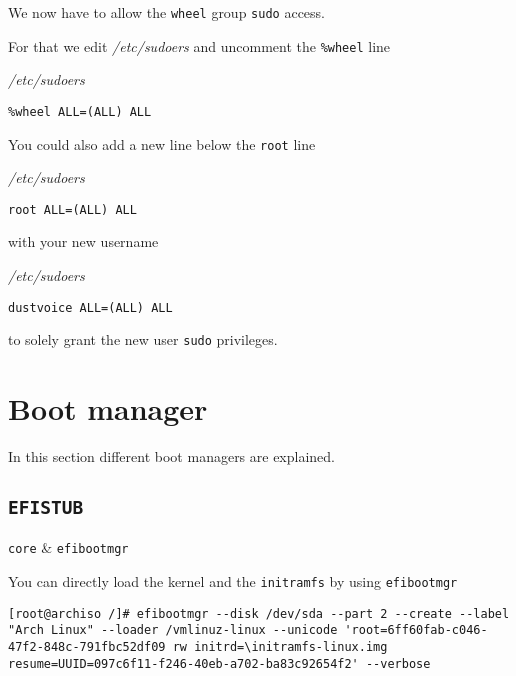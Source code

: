 \documentclass[10pt]{dustdoc}
\begin{document}
We now have to allow the \texttt{wheel} group \texttt{sudo} access.

For that we edit \textit{/etc/sudoers} and uncomment the \texttt{\%wheel} line

\begin{mintedlisting}
    \caption*{\textit{/etc/sudoers}}
    \begin{verbatim}
%wheel ALL=(ALL) ALL
    \end{verbatim}
\end{mintedlisting}

You could also add a new line below the \texttt{root} line

\begin{mintedlisting}
    \caption*{\textit{/etc/sudoers}}
    \begin{verbatim}
root ALL=(ALL) ALL
    \end{verbatim}
\end{mintedlisting}

\noindent
with your new username

\begin{mintedlisting}
    \caption*{\textit{/etc/sudoers}}
    \begin{verbatim}
dustvoice ALL=(ALL) ALL
    \end{verbatim}
\end{mintedlisting}

\noindent
to solely grant the new user \texttt{sudo} privileges.

\section{Boot manager}
\label{sec:boot-manager}

In this section different boot managers are explained.

\subsection{\texttt{EFISTUB}}
\label{sec:efistub}

\begin{packagetable}
    \texttt{core} & \texttt{efibootmgr} \\ 
\end{packagetable}

You can directly load the kernel and the \texttt{initramfs} by using \texttt{efibootmgr}

\begin{verbatim}
[root@archiso /]# efibootmgr --disk /dev/sda --part 2 --create --label "Arch Linux" --loader /vmlinuz-linux --unicode 'root=6ff60fab-c046-47f2-848c-791fbc52df09 rw initrd=\initramfs-linux.img resume=UUID=097c6f11-f246-40eb-a702-ba83c92654f2' --verbose
\end{verbatim}
\end{document}
